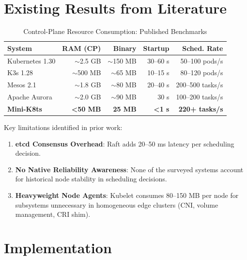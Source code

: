 \documentclass[11pt,a4paper]{article}
\begin{document}
\section{Existing Results from Literature}

\begin{table}[H]
\centering
\caption{Control-Plane Resource Consumption: Published Benchmarks}
\label{tab:existing_results}
\begin{tabular}{@{} l r r r r @{}}
\toprule
\textbf{System}   & \textbf{RAM (CP)} & \textbf{Binary} & \textbf{Startup} & \textbf{Sched. Rate} \\
\midrule
Kubernetes 1.30   & $\sim$2.5 GB      & $\sim$150 MB    & 30--60 s         & 50--100 pods/s      \\
K3s 1.28          & $\sim$500 MB      & $\sim$65 MB     & 10--15 s         & 80--120 pods/s      \\
Mesos 2.1         & $\sim$1.8 GB      & $\sim$80 MB     & 20--40 s         & 200--500 tasks/s    \\
Apache Aurora     & $\sim$2.0 GB      & $\sim$90 MB     & 30 s             & 100--200 tasks/s    \\
\midrule
\textbf{Mini-K8ts}& \textbf{<50 MB}   & \textbf{25 MB}  & \textbf{<1 s}    & \textbf{220+ tasks/s}\\
\bottomrule
\end{tabular}
\end{table}

Key limitations identified in prior work:
\begin{enumerate}[label=\textbf{\arabic*.}]
  \item \textbf{etcd Consensus Overhead}: Raft adds 20--50 ms latency per scheduling decision.
  \item \textbf{No Native Reliability Awareness}: None of the surveyed systems account for
        historical node stability in scheduling decisions.
  \item \textbf{Heavyweight Node Agents}: Kubelet consumes 80--150 MB per node for subsystems
        unnecessary in homogeneous edge clusters (CNI, volume management, CRI shim).
\end{enumerate}

\section{Implementation}
\end{document}
